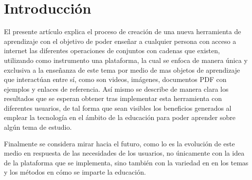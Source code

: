 \documentclass{llncs}
\begin{document}
\section{Introducción}
%
El presente artículo explica el proceso de creación de una nueva herramienta de aprendizaje con el objetivo de poder enseñar a cualquier persona con acceso a internet las diferentes operaciones de conjuntos con cadenas que existen, utilizando como instrumento una plataforma, la cual se enfoca de manera única y exclusiva a la enseñanza de este tema por medio de mas objetos de aprendizaje que interactúan entre sí, como son videos, imágenes, documentos PDF con ejemplos y enlaces de referencia. Así mismo se describe de manera clara los resultados que se esperan obtener tras implementar esta herramienta con diferentes usuarios, de tal forma que sean visibles los beneficios generados al emplear la tecnología en el ámbito de la educación  para poder aprender sobre algún tema de estudio.

Finalmente se considera mirar hacia el futuro, como lo es la evolución de este medio en respuesta de las necesidades de los usuarios, no únicamente con la idea de la plataforma que se implementa, sino también con la variedad en en los temas y los métodos en cómo se imparte la educación.

%
\end{document}
